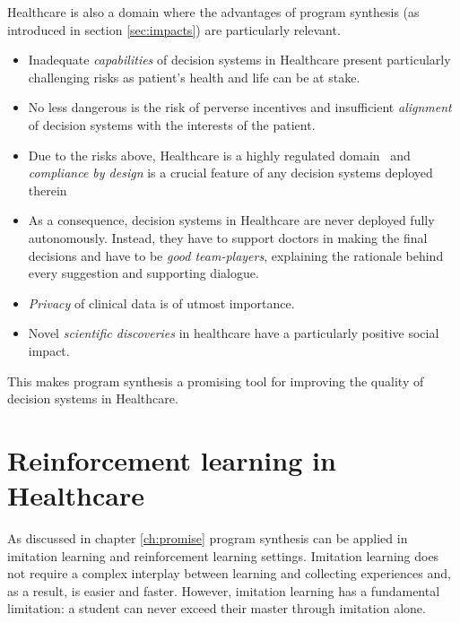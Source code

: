 Healthcare is also a domain where the advantages of program synthesis (as introduced in section \ref{sec:impacts}) are particularly relevant.
\begin{itemize}
    \item Inadequate \emph{capabilities} of decision systems in Healthcare present particularly challenging risks as patient's health and life can be at stake.
    \item No less dangerous is the risk of perverse incentives and insufficient \emph{alignment} of decision systems with the interests of the patient.
    \item Due to the risks above, Healthcare is a highly regulated domain~\cite{asamoahRoleHealthServices2025, barbosaActorsHealthcareRegulation2021, beaussierAccountingFailureRiskbased2016, brennanNewRulesRegulation1996, brownPoliticalEvolutionFederal1992, buschAIRegulationHealthcare2025, changHealthCareRegulation2004, flodgrenExternalInspectionCompliance, kwonSecurityPracticesRegulatory2013, nunesPublicAccountabilitySunshine2011, oikonomouPatientSafetyRegulation2019, oyriHealthcareRegulationResiliencea2021, schaumansEntryRegulationEvidence2008, seddonCloudComputingTransborder2013, sheikhWhatExplainsRegulatory2015, steinkampRegulationHealthcareEthics2007, terryRegulatingHealthcareAI2019} and \emph{compliance by design} is a crucial feature of any decision systems deployed therein
    \item As a consequence, decision systems in Healthcare are never deployed fully autonomously. Instead, they have to support doctors in making the final decisions and have to be \emph{good team-players}, explaining the rationale behind every suggestion and supporting dialogue.
    \item \emph{Privacy} of clinical data is of utmost importance.
    \item Novel \emph{scientific discoveries} in healthcare have a particularly positive social impact.
\end{itemize}

This makes program synthesis a promising tool for improving the quality of decision systems in Healthcare.

\section{Reinforcement learning in Healthcare}
\label{sec:rl-health}

As discussed in chapter \ref{ch:promise} program synthesis can be applied in imitation learning and reinforcement learning settings.
Imitation learning does not require a complex interplay between learning and collecting experiences and, as a result, is easier and faster.
However, imitation learning has a fundamental limitation: a student can never exceed their master through imitation alone.

